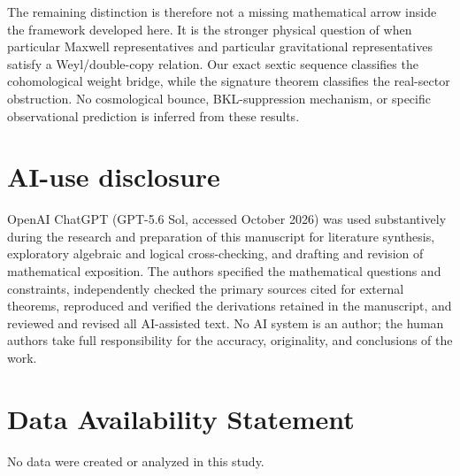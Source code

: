 \documentclass[aps,prd,reprint,nofootinbib,superscriptaddress]{revtex4-2}
\theoremstyle{definition}
\theoremstyle{remark}
\begin{document}
The remaining distinction is therefore not a missing mathematical arrow inside the framework developed here.  It is the stronger physical question of when particular Maxwell representatives and particular gravitational representatives satisfy a Weyl/double-copy relation.  Our exact sextic sequence classifies the cohomological weight bridge, while the signature theorem classifies the real-sector obstruction.  No cosmological bounce, BKL-suppression mechanism, or specific observational prediction is inferred from these results.

\section*{AI-use disclosure}
OpenAI ChatGPT (GPT-5.6 Sol, accessed October 2026) was used substantively during the research and preparation of this manuscript for literature synthesis, exploratory algebraic and logical cross-checking, and drafting and revision of mathematical exposition. The authors specified the mathematical questions and constraints, independently checked the primary sources cited for external theorems, reproduced and verified the derivations retained in the manuscript, and reviewed and revised all AI-assisted text. No AI system is an author; the human authors take full responsibility for the accuracy, originality, and conclusions of the work.

\section*{Data Availability Statement}
No data were created or analyzed in this study.
\end{document}
